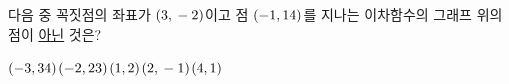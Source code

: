 다음 중 꼭짓점의 좌표가 $(3{,}\mkern3mu -2)$이고 점 $(-1{,}\mkern3mu 14)$를 지나는 이차함수의 그래프 위의 점이 \underline{아닌} 것은?
\begin{choices32}{$(-3{,}\mkern3mu 34)$}{$(-2{,}\mkern3mu 23)$}{$(1{,}\mkern3mu 2)$}{$(2{,}\mkern3mu -1)$}{$(4{,}\mkern3mu 1)$}\end{choices32}
